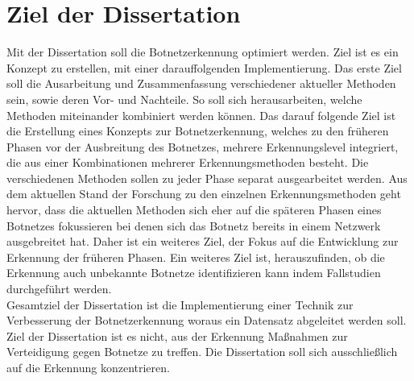 \section{Ziel der Dissertation}
\label{sec:goals}

Mit der Dissertation soll die Botnetzerkennung optimiert werden. Ziel ist es ein Konzept zu erstellen, mit einer darauffolgenden Implementierung. Das erste Ziel soll 
die Ausarbeitung und Zusammenfassung verschiedener aktueller Methoden sein, sowie deren Vor- und Nachteile. So soll sich herausarbeiten, welche Methoden miteinander
kombiniert werden können. Das darauf folgende Ziel ist die Erstellung eines Konzepts zur Botnetzerkennung, welches zu den früheren Phasen vor der Ausbreitung des 
Botnetzes, mehrere Erkennungslevel integriert, die aus einer Kombinationen mehrerer Erkennungsmethoden besteht. Die verschiedenen Methoden sollen zu jeder Phase separat 
ausgearbeitet werden. Aus dem aktuellen Stand der Forschung zu den einzelnen Erkennungsmethoden geht hervor, 
dass die aktuellen Methoden sich eher auf die späteren Phasen eines Botnetzes fokussieren bei denen sich das Botnetz bereits in einem Netzwerk ausgebreitet hat. 
Daher ist ein weiteres Ziel, der Fokus auf die Entwicklung zur Erkennung der früheren Phasen. Ein weiteres Ziel ist, herauszufinden, ob die Erkennung auch unbekannte Botnetze 
identifizieren kann indem Fallstudien durchgeführt werden. \\ Gesamtziel der Dissertation ist die Implementierung einer Technik zur Verbesserung der Botnetzerkennung woraus
ein Datensatz abgeleitet werden soll. Ziel der Dissertation ist es nicht, aus der Erkennung Maßnahmen zur Verteidigung gegen Botnetze zu treffen. Die Dissertation soll sich 
ausschließlich auf die Erkennung konzentrieren. 
